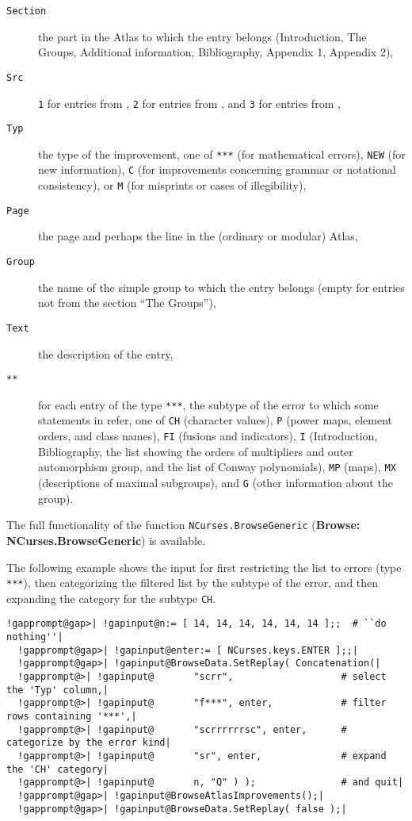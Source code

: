 \documentclass[a4paper,11pt]{report}
\begin{document}
{{{ 
\begin{description}
\item[{\texttt{Section}}]  the part in the \textsf{Atlas} to which the entry belongs (Introduction, The Groups, Additional information,
Bibliography, Appendix 1, Appendix 2), 
\item[{\texttt{Src}}]  \texttt{1} for entries from \cite{BN95}, \texttt{2} for entries from \cite{AtlasImpII}, and \texttt{3} for entries from \cite{ABCImp}, 
\item[{\texttt{Typ}}]  the type of the improvement, one of \texttt{***} (for mathematical errors), \texttt{NEW} (for new information), \texttt{C} (for improvements concerning grammar or notational consistency), or \texttt{M} (for misprints or cases of illegibility), 
\item[{\texttt{Page}}]  the page and perhaps the line in the (ordinary or modular) \textsf{Atlas}, 
\item[{\texttt{Group}}]  the name of the simple group to which the entry belongs (empty for entries not
from the section ``The Groups''), 
\item[{\texttt{Text}}]  the description of the entry, 
\item[{\texttt{**}}]  for each entry of the type \texttt{***}, the subtype of the error to which some statements in \cite{BMO17} refer, one of \texttt{CH} (character values), \texttt{P} (power maps, element orders, and class names), \texttt{FI} (fusions and indicators), \texttt{I} (Introduction, Bibliography, the list showing the orders of multipliers and
outer automorphism group, and the list of Conway polynomials), \texttt{MP} (maps), \texttt{MX} (descriptions of maximal subgroups), and \texttt{G} (other information about the group). 
\end{description}
 

 The full functionality of the function \texttt{NCurses.BrowseGeneric} (\textbf{Browse: NCurses.BrowseGeneric}) is available. 

 The following example shows the input for first restricting the list to errors
(type \texttt{***}), then categorizing the filtered list by the subtype of the error, and then
expanding the category for the subtype \texttt{CH}. 

 
\begin{Verbatim}[commandchars=!@|,fontsize=\small,frame=single,label=Example]
  !gapprompt@gap>| !gapinput@n:= [ 14, 14, 14, 14, 14, 14 ];;  # ``do nothing''|
  !gapprompt@gap>| !gapinput@enter:= [ NCurses.keys.ENTER ];;|
  !gapprompt@gap>| !gapinput@BrowseData.SetReplay( Concatenation(|
  !gapprompt@>| !gapinput@       "scrr",                   # select the 'Typ' column,|
  !gapprompt@>| !gapinput@       "f***", enter,            # filter rows containing '***',|
  !gapprompt@>| !gapinput@       "scrrrrrrsc", enter,      # categorize by the error kind|
  !gapprompt@>| !gapinput@       "sr", enter,              # expand the 'CH' category|
  !gapprompt@>| !gapinput@       n, "Q" ) );               # and quit|
  !gapprompt@gap>| !gapinput@BrowseAtlasImprovements();|
  !gapprompt@gap>| !gapinput@BrowseData.SetReplay( false );|
\end{Verbatim}
 }

}}
\end{document}
